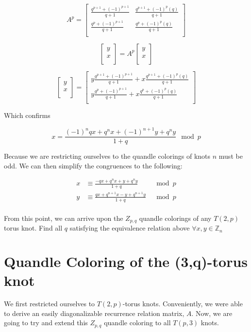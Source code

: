 \documentclass[paper.tex]{subfiles}
\begin{document}
\[
A^{p}=
\left[ \begin{array}{ccc}
\frac{q^{p+1} + (-1)^{p+1}}{q+1} & \frac{q^{p+1} + (-1)^{p}(q)}{q+1} \\
\frac{q^{p} + (-1)^{p+1}}{q+1} & \frac{q^{p} + (-1)^{p}(q)}{q+1} \\
\end{array} \right]
\]

\[
\left[ \begin{array}{ccc}
y \\
x \\
\end{array} \right]=
A^{p}
\left[ \begin{array}{ccc}
y \\
x \\
\end{array} \right]
\]

\[
\left[ \begin{array}{ccc}
y \\
x \\
\end{array} \right]=
\left[ \begin{array}{ccc}
y \frac{q^{p+1} + (-1)^{p+1}}{q+1} + x \frac{q^{p+1} + (-1)^{p}(q)}{q+1} \\
y \frac{q^{p} + (-1)^{p+1}}{q+1} + x \frac{q^{p} + (-1)^{p}(q)}{q+1} \\
\end{array} \right]
\]

Which confirms

$$x = \frac{(-1)^nqx+q^nx+(-1)^{n+1}y+q^ny}{1+q} \mod p $$

Because we are restricting ourselves to the quandle colorings of knots $n$ must be odd. We can then simplify the congruences to the following:

\begin{align*}
	x &\equiv \frac{-qx+q^nx+y+q^ny}{1+q} & \mod{p} \\
	y &\equiv \frac{qx+q^{n+1}x-y+q^{n+1}y}{1+q} & \mod{p} \\
\end{align*}

From this point, we can arrive upon the $Z_{p,q}$ quandle colorings of any $T(2, p)$ torus knot. Find all $q$  satisfying the equivalence relation above $\forall x,y \in \mathbb{Z}_n$

\section{Quandle Coloring of the (3,q)-torus knot}\label{sec:2ntorus}
We first restricted ourselves to $T(2,p)$-torus knots. Conveniently, we were able to derive an easily diagonalizable recurrence relation matrix, $A$. Now, we are going to try and extend this $Z_{p,q}$ quandle coloring to all $T(p,3)$ knots. 
\end{document}
